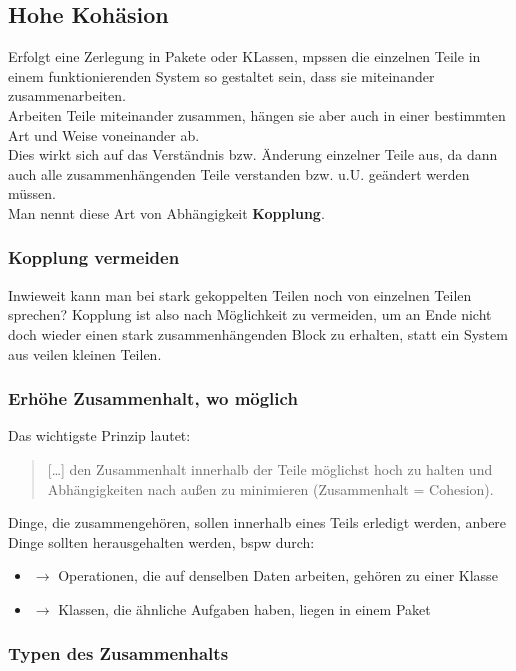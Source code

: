\subsection{Hohe Kohäsion}
Erfolgt eine Zerlegung in Pakete oder KLassen, mpssen die einzelnen Teile in einem funktionierenden System so gestaltet sein, dass sie miteinander zusammenarbeiten.\\
Arbeiten Teile miteinander zusammen, hängen sie aber auch in einer bestimmten Art und Weise voneinander ab.\\
Dies wirkt sich auf das Verständnis bzw. Änderung einzelner Teile aus, da dann auch alle zusammenhängenden Teile verstanden bzw. u.U. geändert werden müssen.\\

\noindent
Man nennt diese Art von Abhängigkeit \textbf{Kopplung}.

\subsubsection*{Kopplung vermeiden}
Inwieweit kann man bei stark gekoppelten Teilen noch von einzelnen Teilen sprechen? Kopplung ist also nach Möglichkeit zu vermeiden, um an Ende nicht doch wieder einen stark zusammenhängenden Block zu erhalten, statt ein System aus veilen kleinen Teilen.

\subsubsection*{Erhöhe Zusammenhalt, wo möglich}
Das wichtigste Prinzip lautet:

\blockquote[{\cite[71]{Wed09b}}]{
[\ldots] den Zusammenhalt innerhalb der Teile möglichst hoch zu halten und Abhängigkeiten nach außen zu minimieren (Zusammenhalt = Cohesion).
}
\noindent
Dinge, die zusammengehören, sollen innerhalb eines Teils erledigt werden, anbere Dinge sollten herausgehalten werden, bspw durch:

\begin{itemize}
    \item $\rightarrow$ Operationen, die auf denselben Daten arbeiten, gehören zu einer Klasse
    \item $\rightarrow$ Klassen, die ähnliche Aufgaben haben, liegen in einem Paket
\end{itemize}

\subsubsection*{Typen des Zusammenhalts}

